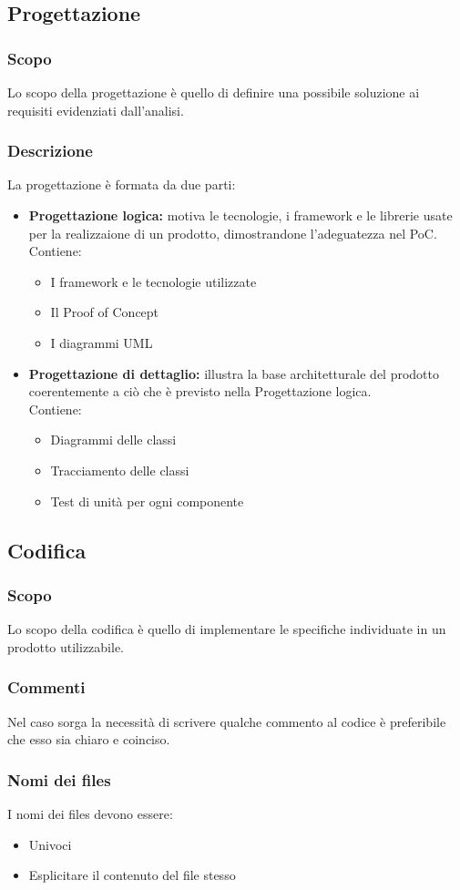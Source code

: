  \subsection{Progettazione}
  \subsubsection{Scopo}
  Lo scopo della progettazione è quello di definire una possibile soluzione ai requisiti evidenziati dall'analisi.
  \subsubsection{Descrizione}
  La progettazione è formata da due parti:
  \begin{itemize}
    \item \textbf{Progettazione logica:} motiva le tecnologie, i framework e le librerie usate per la realizzaione di un prodotto, dimostrandone l'adeguatezza nel PoC.
    \\Contiene:
    \begin{itemize}
      \item I framework e le tecnologie utilizzate
      \item Il Proof of Concept
      \item I diagrammi UML
    \end{itemize}
    \item \textbf{Progettazione di dettaglio:} illustra la base architetturale del prodotto coerentemente a ciò che è previsto nella Progettazione logica.
    \\Contiene:
    \begin{itemize}
      \item Diagrammi delle classi
      \item Tracciamento delle classi
      \item Test di unità per ogni componente
    \end{itemize}
  \end{itemize}
  
  \subsection{Codifica}
  \subsubsection{Scopo}
  Lo scopo della codifica è quello di implementare le specifiche individuate in un prodotto utilizzabile.
  \subsubsection{Commenti}
  Nel caso sorga la necessità di scrivere qualche commento al codice è preferibile che esso sia chiaro e coinciso.
  \subsubsection{Nomi dei files}
  I nomi dei files devono essere:
  \begin{itemize}
    \item Univoci
    \item Esplicitare il contenuto del file stesso
  \end{itemize}
